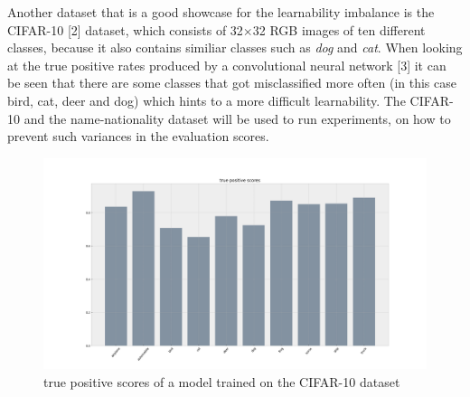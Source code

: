 \documentclass[journal]{IEEEtran}
\begin{document}
Another dataset that is a good showcase for the learnability imbalance is the CIFAR-10 [2] dataset, which consists of 32$\times$32 RGB images of ten different classes, because it also contains similiar classes such as \emph{dog} and \emph{cat}.
When looking at the true positive rates produced by a convolutional neural network [3] it can be seen that there are some classes that got misclassified more often (in this case bird, cat, deer and dog) which hints to a more difficult learnability. 
The CIFAR-10 and the name-nationality dataset will be used to run experiments, on how to prevent such variances in the evaluation scores.

\begin{figure}[h!]
        \includegraphics[width=\linewidth]{images/cifar10_tp_scores.png}
        \caption{true positive scores of a model trained on the CIFAR-10 dataset}
        \label{fig:tp2_scores}
\end{figure}

%
%
 
\end{document}
